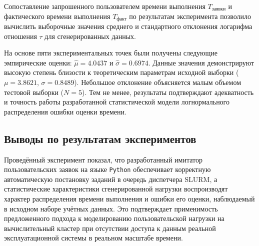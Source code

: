 Сопоставление запрошенного пользователем времени выполнения
$T_{\text{заявки}}$ и фактического времени выполнения $T_{\text{факт}}$
по результатам эксперимента позволило вычислить выборочные значения
среднего и стандартного отклонения логарифма отношения $\tau$ для
сгенерированных данных. 

На основе пяти экспериментальных точек были получены следующие эмпирические 
оценки: $\hat{\mu} = 4.0437$ и $\hat{\sigma} = 0.6974$. Данные значения демонстрируют 
высокую степень близости к теоретическим параметрам исходной выборки ($\mu = 3.8621$, 
$\sigma = 0.8489$). Небольшое отклонение объясняется малым объемом тестовой выборки ($N=5$). 
Тем не менее, результаты подтверждают адекватность и точность работы разработанной 
статистической модели логнормального распределения ошибки оценки времени.

\subsection{Выводы по результатам экспериментов}

Проведённый эксперимент показал, что разработанный имитатор
пользовательских заявок на языке \texttt{Python} обеспечивает корректную автоматическую
постановку заданий в очередь диспетчера SLURM, а статистические
характеристики сгенерированной нагрузки воспроизводят характер
распределения времени выполнения и ошибки его оценки, наблюдаемый в
исходном наборе учётных данных. Это подтверждает применимость
предложенного подхода к моделированию пользовательской нагрузки на
вычислительный кластер при отсутствии доступа к данным реальной
эксплуатационной системы в реальном масштабе времени.
